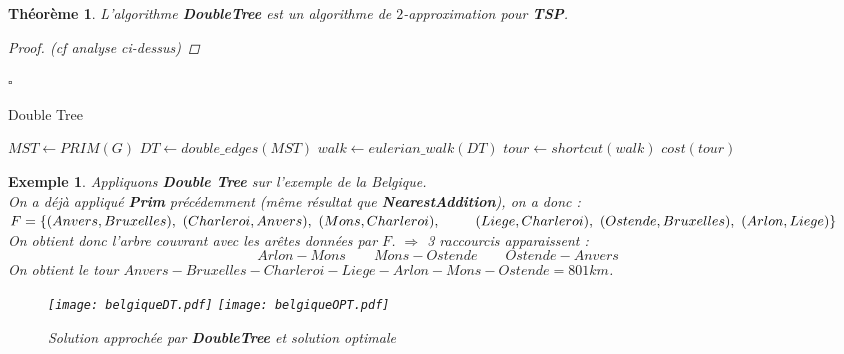 \documentclass[12pt]{article}
\newcommand{\titre}[1]{\textcolor{title}{#1}}
\newcommand{\cqfd}{\begin{flushright}$\square$\end{flushright}}
\newtheorem{exemple}{Exemple}[section]
\newtheorem{thm}{Th\'eor\`eme}[section]
\newtheorem{proof}{Preuve}[section]
\begin{document}
\begin{thm}
L'algorithme \textbf{DoubleTree} est un algorithme de $2$-approximation pour \textbf{\titre{TSP}}.
\begin{proof} (cf analyse ci-dessus)
\end{proof}
\cqfd
\end{thm}

\begin{algorithm}[H]
\caption{Double Tree}
\begin{algorithmic}[1]
\STATE $MST\leftarrow PRIM(G)$
\STATE $DT \leftarrow double\_edges(MST)$
\STATE $walk \leftarrow eulerian\_walk(DT)$
\STATE $tour \leftarrow shortcut(walk)$
\RETURN $cost(tour)$
\end{algorithmic}
\end{algorithm}

\begin{exemple} Appliquons \textbf{Double Tree} sur l'exemple de la Belgique. \\
On a déjà appliqué \textbf{Prim} précédemment (même résultat que \textbf{NearestAddition}), on a donc : \\
$	F = \{(Anvers,Bruxelles),\ (Charleroi, Anvers),\ (Mons, Charleroi),\ \\\indent\quad  (Liege, Charleroi),\ (Ostende, Bruxelles),\ (Arlon,
Liege)\} $ \\
On obtient donc l'arbre couvrant avec les arêtes données par $F$. $\Rightarrow$ 3 raccourcis apparaissent :
$$Arlon-Mons\qquad Mons-Ostende\qquad Ostende-Anvers$$
On obtient le tour $Anvers-Bruxelles-Charleroi-Liege-Arlon-Mons-Ostende = 801km$.
\begin{figure}[H]
    \begin{center}
    \texttt{[image: belgiqueDT.pdf]}
    \texttt{[image: belgiqueOPT.pdf]}
    \caption{Solution approchée par \textbf{DoubleTree} et solution optimale}
    \end{center}
\end{figure}
\end{exemple}
\end{document}

